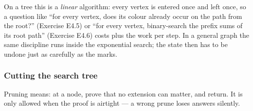 On a tree this is a \emph{linear} algorithm: every vertex is entered once and left once, so a question like ``for every vertex, does its colour already occur on the path from the root?'' (Exercise E4.5) or ``for every vertex, binary-search the prefix sums of its root path'' (Exercise E4.6) costs \VE{} plus the work per step. In a general graph the same discipline runs inside the exponential search; the state then has to be undone just as carefully as the marks.

\subsubsection*{Cutting the search tree}

Pruning means: at a node, prove that no extension can matter, and return. It is only allowed when the proof is airtight --- a wrong prune loses answers silently.

